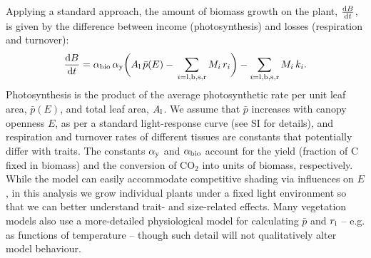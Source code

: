 \documentclass[9pt,twocolumn,twoside,lineno]{pnas-new}
\begin{document}
Applying a standard approach, the amount of biomass growth on the plant, $\frac{{\rm d}B}{{\rm d}t}$, is given by the difference between income (photosynthesis) and losses (respiration and turnover)\citep{Makela-1997, Thornley-2000}:
\begin{equation}\label{eq:dbdt}
\frac{{\rm d}B}{{\rm d}t}
= \alpha_{\rm bio} \,
\alpha_{\rm y}
\bigg( A_{\rm l} \, \bar{p}(E) -
\, \sum_{i = {\rm l}, {\rm b}, {\rm s}, {\rm r}}{M_i \, r_i}\bigg)
- \sum_{i = {\rm l}, {\rm b}, {\rm s},  {\rm r}}{M_i \, k_i}.
\end{equation}
Photosynthesis is the product of the average photosynthetic rate per unit leaf area, $\bar{p}(E)$, and total leaf area, $A_{\rm l}$. We assume that $\bar{p}$ increases with canopy openness $E$, as per a standard light-response curve (see SI for details), and respiration and turnover rates of different tissues are constants that potentially differ with traits. The constants $\alpha_{\rm y}$ and $\alpha_{\rm bio}$ account for the yield (fraction of C fixed in biomass) and the conversion of CO$_2$ into units of biomass, respectively. While the {\plant} model can easily accommodate competitive shading via influences on $E$, in this analysis we grow individual plants under a fixed light environment so that we can better understand trait- and size-related effects. Many vegetation models also use a more-detailed physiological model for calculating $\bar{p}$ and $r_{\rm i}$ -- e.g. as functions of temperature -- though such detail will not qualitatively alter model behaviour.
\end{document}
